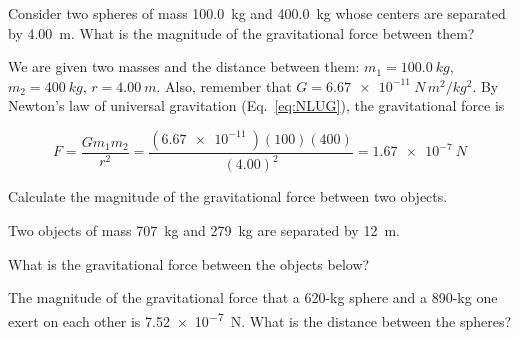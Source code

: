 \documentclass{article}
\begin{document}
\begin{example}
Consider two spheres of mass \SI{100.0}{kg} and \SI{400.0}{kg} whose centers are separated by \SI{4.00}{m}. What is the magnitude of the gravitational force between them?
\vspace{1ex}

\Solution We are given two masses and the distance between them: $m_1 = \SI{100.0}{kg}$, $m_2 = \SI{400}{kg}$, $r = \SI{4.00}{m}$. Also, remember that $G = \SI{6.67e-11}{N\,m^2/kg^2}$. By Newton's law of universal gravitation (Eq.~\ref{eq:NLUG}), the gravitational force is

\begin{equation*}
    F = \frac{G m_1 m_2}{r^2} = 
    \frac{\left(\SI{6.67e-11}{}\right) \left(100\right) \left(400\right)}{\left(4.00\right)^2} = 
    \SI{1.67e-7}{N}
\end{equation*}
\end{example}

\cyanhrule
\vspace{2ex}

Calculate the magnitude of the gravitational force between two objects.

\begin{exercise} \label{9DkhbB}
Two objects of mass \SI{707}{kg} and \SI{279}{kg} are separated by \SI{12}{m}. 
\end{exercise}



\begin{exercise} \label{MMnbpt}
What is the gravitational force between the objects below?
\vspace{-2em}

\begin{center}
    \centering
\end{center}
\end{exercise}

\begin{example}
    The magnitude of the gravitational force that a 620-kg sphere and a 890-kg one exert on each other is \SI{7.52e-7}{N}. What is the distance between the spheres?
\end{example}
\end{document}
